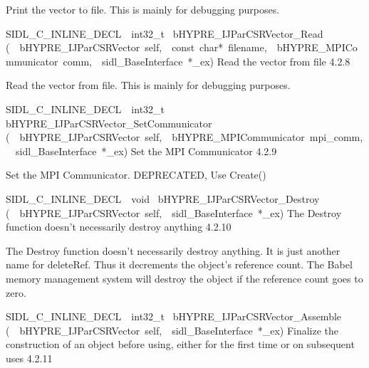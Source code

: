 \documentclass{article}
\begin{document}
\begin{cxxentry}
\begin{cxxentry}
\begin{cxxfunction}
\begin{cxxdoc}
Print the vector to file.  This is mainly for debugging
purposes.
\end{cxxdoc}
\end{cxxfunction}
\begin{cxxfunction}
{SIDL\_C\_INLINE\_DECL\ \ int32\_t\ }
        {bHYPRE\_IJParCSRVector\_Read}
        {(\ \ bHYPRE\_IJParCSRVector\ self,\ \ const\ char*\ filename,\ \ bHYPRE\_MPICommunicator\ comm,\ \ sidl\_BaseInterface\ *\_ex)}
        {
Read the vector from file}
        {4.2.8}
\begin{cxxdoc}

Read the vector from file.  This is mainly for debugging
purposes.
\end{cxxdoc}
\end{cxxfunction}
\begin{cxxfunction}
{SIDL\_C\_INLINE\_DECL\ \ int32\_t\ }
        {bHYPRE\_IJParCSRVector\_SetCommunicator}
        {(\ \ bHYPRE\_IJParCSRVector\ self,\ \ bHYPRE\_MPICommunicator\ mpi\_comm,\ \ sidl\_BaseInterface\ *\_ex)}
        {
Set the MPI Communicator}
        {4.2.9}
\begin{cxxdoc}

Set the MPI Communicator.  DEPRECATED, Use Create()
\end{cxxdoc}
\end{cxxfunction}
\begin{cxxfunction}
{SIDL\_C\_INLINE\_DECL\ \ void\ }
        {bHYPRE\_IJParCSRVector\_Destroy}
        {(\ \ bHYPRE\_IJParCSRVector\ self,\ \ sidl\_BaseInterface\ *\_ex)}
        {
The Destroy function doesn't necessarily destroy anything}
        {4.2.10}
\begin{cxxdoc}

The Destroy function doesn't necessarily destroy anything.
It is just another name for deleteRef.  Thus it decrements the
object's reference count.  The Babel memory management system will
destroy the object if the reference count goes to zero.
\end{cxxdoc}
\end{cxxfunction}
\begin{cxxfunction}
{SIDL\_C\_INLINE\_DECL\ \ int32\_t\ }
        {bHYPRE\_IJParCSRVector\_Assemble}
        {(\ \ bHYPRE\_IJParCSRVector\ self,\ \ sidl\_BaseInterface\ *\_ex)}
        {
Finalize the construction of an object before using, either
for the first time or on subsequent uses}
        {4.2.11}
\begin{cxxdoc}


\end{cxxdoc}
\end{cxxfunction}
\end{cxxentry}
\end{cxxentry}
\end{document}
